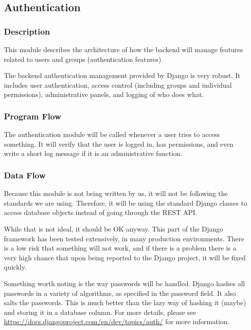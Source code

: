 
\subsection{Authentication}

\subsubsection{Description}

This module describes the architecture of how the backend will manage features related to users and groups (authentication features).

The backend authentication management provided by Django is very robust.
It includes user authentication, access control (including groups and individual permissions), administrative panels, and logging of who does what.


\subsubsection{Program Flow}

The authentication module will be called whenever a user tries to access something.
It will verify that the user is logged in, has permissions, and even write a short log message if it is an administrative function.

\subsubsection{Data Flow}

Because this module is not being written by us, it will not be following the standards we are using.
Therefore, it will be using the standard Django classes to access database objects instead of going through the REST API.


While that is not ideal, it should be OK anyway.
This part of the Django framework has been tested extensively, in many production environments.
There is a low risk that something will not work, and if there is a problem there is a very high chance that upon being reported to the Django project, it will be fixed quickly.

Something worth noting is the way passwords will be handled.
Django hashes all passwords in a variety of algorithms, as specified in the password field.
It also salts the passwords.
This is much better than the lazy way of hashing it (maybe) and storing it in a database column.
For more details, please see \url{https://docs.djangoproject.com/en/dev/topics/auth/} for more information.

